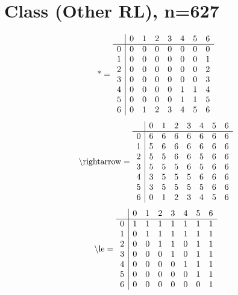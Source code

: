 \documentclass[11pt]{article}
\begin{document}
\section{Class (Other RL), n=627}
\[\text{*} = 
\begin{array}{r | r r r r r r r}
 & 0 & 1 & 2 & 3 & 4 & 5 & 6 \\ \hline
0 & 0 & 0 & 0 & 0 & 0 & 0 & 0 \\
1 & 0 & 0 & 0 & 0 & 0 & 0 & 1 \\
2 & 0 & 0 & 0 & 0 & 0 & 0 & 2 \\
3 & 0 & 0 & 0 & 0 & 0 & 0 & 3 \\
4 & 0 & 0 & 0 & 0 & 1 & 1 & 4 \\
5 & 0 & 0 & 0 & 0 & 1 & 1 & 5 \\
6 & 0 & 1 & 2 & 3 & 4 & 5 & 6 \\
\end{array}
\]
\[\text{\textbackslash rightarrow} = 
\begin{array}{r | r r r r r r r}
 & 0 & 1 & 2 & 3 & 4 & 5 & 6 \\ \hline
0 & 6 & 6 & 6 & 6 & 6 & 6 & 6 \\
1 & 5 & 6 & 6 & 6 & 6 & 6 & 6 \\
2 & 5 & 5 & 6 & 6 & 5 & 6 & 6 \\
3 & 5 & 5 & 5 & 6 & 5 & 6 & 6 \\
4 & 3 & 5 & 5 & 5 & 6 & 6 & 6 \\
5 & 3 & 5 & 5 & 5 & 5 & 6 & 6 \\
6 & 0 & 1 & 2 & 3 & 4 & 5 & 6 \\
\end{array}
\]
\[\text{\textbackslash le} = 
\begin{array}{r | r r r r r r r}
 & 0 & 1 & 2 & 3 & 4 & 5 & 6 \\ \hline
0 & 1 & 1 & 1 & 1 & 1 & 1 & 1 \\
1 & 0 & 1 & 1 & 1 & 1 & 1 & 1 \\
2 & 0 & 0 & 1 & 1 & 0 & 1 & 1 \\
3 & 0 & 0 & 0 & 1 & 0 & 1 & 1 \\
4 & 0 & 0 & 0 & 0 & 1 & 1 & 1 \\
5 & 0 & 0 & 0 & 0 & 0 & 1 & 1 \\
6 & 0 & 0 & 0 & 0 & 0 & 0 & 1 \\
\end{array}
\]
\end{document}
